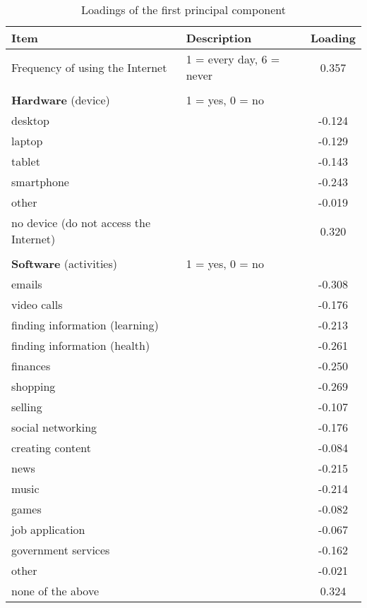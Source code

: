 \documentclass[12pt]{article}
\begin{document}
    \begin{table}[h!]
        \centering
        \caption{Loadings of the first principal component}
        \label{tab:pc1_loadings_q2}
        \begin{tabular}{llc}
            \toprule
            Item & Description & Loading \\
            \midrule
            Frequency of using the Internet & 1 = every day, 6 = never & 0.357 \\
            & & \\
            \textbf{Hardware} (device) & 1 = yes, 0 = no & \\
            desktop &  & -0.124 \\
            laptop &  & -0.129 \\
            tablet &  & -0.143 \\
            smartphone &  & -0.243 \\
            other &  & -0.019 \\
            no device (do not access the Internet) &  & 0.320 \\
            & & \\
            \textbf{Software} (activities) & 1 = yes, 0 = no & \\
            emails &  & -0.308 \\
            video calls &  & -0.176 \\
            finding information (learning) &  & -0.213 \\
            finding information (health) &  & -0.261 \\
            finances &  & -0.250 \\
            shopping &  & -0.269 \\
            selling &  & -0.107 \\
            social networking &  & -0.176 \\
            creating content &  & -0.084 \\
            news &  & -0.215 \\
            music &  & -0.214 \\
            games &  & -0.082 \\
            job application &  & -0.067 \\
            government services &  & -0.162 \\
            other &  & -0.021 \\
            none of the above &  & 0.324 \\
            \bottomrule
        \end{tabular}
    \end{table}
\end{document}
